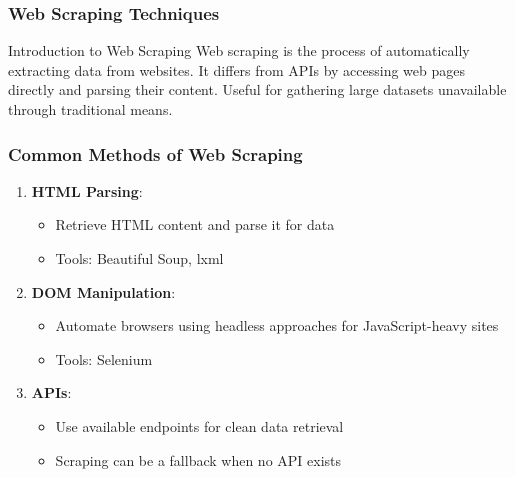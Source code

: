 \documentclass{beamer}
\begin{document}
\begin{frame}[fragile]
    \frametitle{Web Scraping Techniques}
    \begin{block}{Introduction to Web Scraping}
        Web scraping is the process of automatically extracting data from websites. It differs from APIs by accessing web pages directly and parsing their content. Useful for gathering large datasets unavailable through traditional means.
    \end{block}
\end{frame}

\begin{frame}[fragile]
    \frametitle{Common Methods of Web Scraping}
    \begin{enumerate}
        \item \textbf{HTML Parsing}: 
            \begin{itemize}
                \item Retrieve HTML content and parse it for data 
                \item Tools: Beautiful Soup, lxml
            \end{itemize}
        
        \item \textbf{DOM Manipulation}: 
            \begin{itemize}
                \item Automate browsers using headless approaches for JavaScript-heavy sites 
                \item Tools: Selenium
            \end{itemize}
        
        \item \textbf{APIs}: 
            \begin{itemize}
                \item Use available endpoints for clean data retrieval 
                \item Scraping can be a fallback when no API exists 
            \end{itemize}
    \end{enumerate}
\end{frame}
\end{document}
